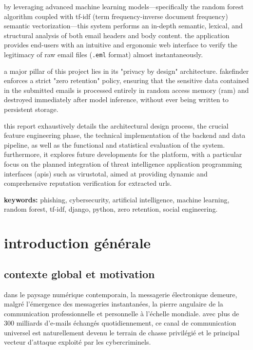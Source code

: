 \documentclass[12pt,a4paper]{report}
\begin{document}
by leveraging advanced machine learning models—specifically the random forest algorithm coupled with tf-idf (term frequency-inverse document frequency) semantic vectorization—this system performs an in-depth semantic, lexical, and structural analysis of both email headers and body content. the application provides end-users with an intuitive and ergonomic web interface to verify the legitimacy of raw email files (\texttt{.eml} format) almost instantaneously.

a major pillar of this project lies in its "privacy by design" architecture. fakefinder enforces a strict "zero retention" policy, ensuring that the sensitive data contained in the submitted emails is processed entirely in random access memory (ram) and destroyed immediately after model inference, without ever being written to persistent storage.

this report exhaustively details the architectural design process, the crucial feature engineering phase, the technical implementation of the backend and data pipeline, as well as the functional and statistical evaluation of the system. furthermore, it explores future developments for the platform, with a particular focus on the planned integration of threat intelligence application programming interfaces (apis) such as virustotal, aimed at providing dynamic and comprehensive reputation verification for extracted urls.

\textbf{keywords:} phishing, cybersecurity, artificial intelligence, machine learning, random forest, tf-idf, django, python, zero retention, social engineering.

\tableofcontents
\newpage
\listoffigures
{}
\newpage
\listoftables
{}

\cleardoublepage
{}
\setcounter{page}{1}

\chapter*{introduction générale}

\section*{contexte global et motivation}
dans le paysage numérique contemporain, la messagerie électronique demeure, malgré l'émergence des messageries instantanées, la pierre angulaire de la communication professionnelle et personnelle à l'échelle mondiale. avec plus de 300 milliards d'e-mails échangés quotidiennement, ce canal de communication universel est naturellement devenu le terrain de chasse privilégié et le principal vecteur d'attaque exploité par les cybercriminels.
\end{document}
